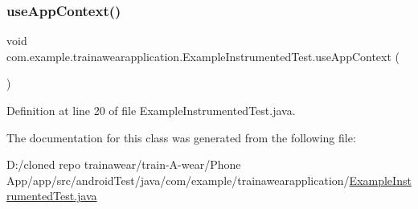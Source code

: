 \subsubsection{\texorpdfstring{useAppContext()}{useAppContext()}}
{\footnotesize\ttfamily void com.\+example.\+trainawearapplication.\+Example\+Instrumented\+Test.\+use\+App\+Context (\begin{DoxyParamCaption}{ }\end{DoxyParamCaption})}



Definition at line 20 of file Example\+Instrumented\+Test.\+java.


\begin{DoxyCode}{0}

\end{DoxyCode}


The documentation for this class was generated from the following file\+:\begin{DoxyCompactItemize}
\item 
D\+:/cloned repo trainawear/train-\/\+A-\/wear/\+Phone App/app/src/android\+Test/java/com/example/trainawearapplication/\mbox{\hyperlink{_example_instrumented_test_8java}{Example\+Instrumented\+Test.\+java}}\end{DoxyCompactItemize}
